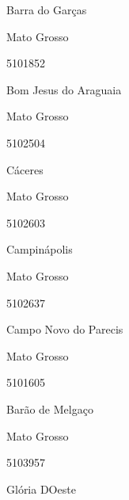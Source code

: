 \documentclass[
  letterpaper,
]{report}
\begin{document}
\n      

Barra do Garças

\n    

\n    

\n      

Mato Grosso

\n      

5101852

\n      

Bom Jesus do Araguaia

\n    

\n    

\n      

Mato Grosso

\n      

5102504

\n      

Cáceres

\n    

\n    

\n      

Mato Grosso

\n      

5102603

\n      

Campinápolis

\n    

\n    

\n      

Mato Grosso

\n      

5102637

\n      

Campo Novo do Parecis

\n    

\n    

\n      

Mato Grosso

\n      

5101605

\n      

Barão de Melgaço

\n    

\n    

\n      

Mato Grosso

\n      

5103957

\n      

Glória D\textquotesingle Oeste

\n    
\end{document}
